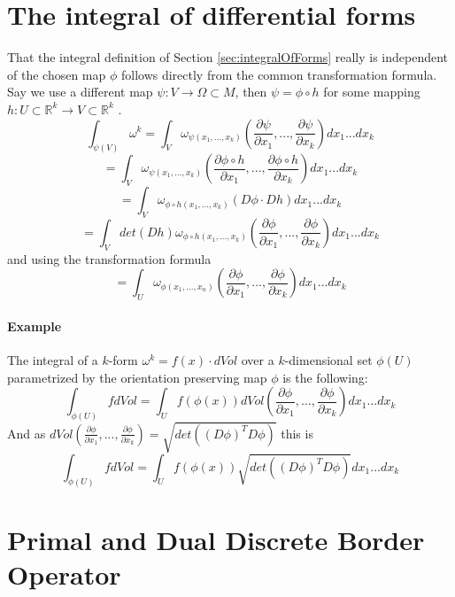 \begin{appendix}

\chapter{The integral of differential forms}
\label{app:integrals}

That the integral definition of Section \ref{sec:integralOfForms} really is independent of the chosen map $\phi$ follows directly from the common transformation formula. Say we use a different map $\psi: V \rightarrow \Omega \subset M$, then $\psi = \phi \circ h$ for some mapping $h:U \subset \mathbb R^k \rightarrow V \subset \mathbb R^k$ . 
\[\int_{\psi(V)} \omega^k = \int_V \omega_{\psi(x_1,...,x_k)}(\frac{\partial \psi}{\partial x_1},...,\frac{\partial \psi}{\partial x_k}) d x_1...d x_k\]
\[= \int_V \omega_{\psi(x_1,...,x_k)}(\frac{\partial \phi \circ h}{\partial x_1},...,\frac{\partial \phi \circ h}{\partial x_k}) d x_1...d x_k\]
\[= \int_V \omega_{\phi\circ h(x_1,...,x_k)}(D\phi \cdot Dh) d x_1...d x_k\]
\[= \int_{V} det(Dh) \omega_{\phi\circ h(x_1,...,x_k)}(\frac{\partial \phi}{\partial x_1},...,\frac{\partial \phi}{\partial x_k}) d x_1...d x_k\]
and using the transformation formula
\[= \int_U \omega_{\phi(x_1,...,x_n)} (\frac{\partial \phi}{\partial x_1},...,\frac{\partial \phi}{\partial x_k}) d x_1...d x_k \]

\subsubsection{Example}
The integral of a $k$-form $\omega^k = f(x) \cdot dVol $ over a $k$-dimensional set $\phi(U)$ parametrized by the orientation preserving map $\phi$ is the following:
\[\int_{\phi(U)} f dVol = \int_{U} f(\phi(x)) dVol(\frac{\partial \phi}{\partial x_1},...,\frac{\partial \phi}{\partial x_k})dx_1...dx_k\]
And as $dVol(\frac{\partial \phi}{\partial x_1},...,\frac{\partial \phi}{\partial x_k}) = \sqrt{det((D\phi)^TD\phi)}$ this is
\[\int_{\phi(U)} f dVol = \int_{U} f(\phi(x)) \sqrt{det((D\phi)^TD\phi)} dx_1...dx_k\]

\chapter{Primal and Dual Discrete Border Operator}


\end{appendix}
